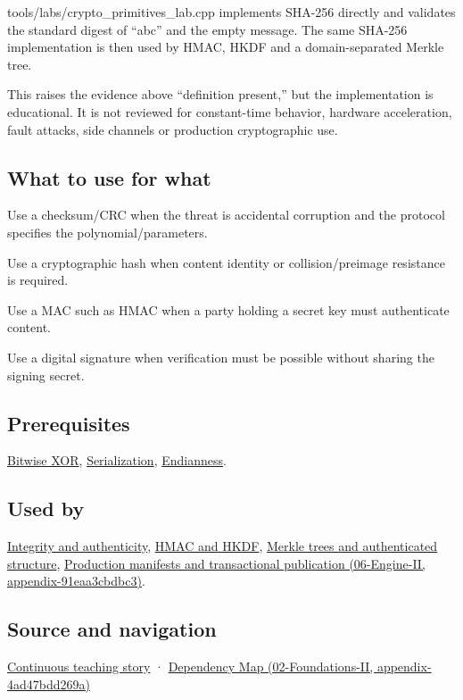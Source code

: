 tools/labs/crypto\_primitives\_lab.cpp implements SHA-256 directly and validates the standard digest of ``abc'' and the empty message. The same SHA-256 implementation is then used by HMAC, HKDF and a domain-separated Merkle tree.

This raises the evidence above ``definition present,'' but the implementation is educational. It is not reviewed for constant-time behavior, hardware acceleration, fault attacks, side channels or production cryptographic use.

\subsection{What to use for what}\label{appendix-ed338677de0a-what-to-use-for-what}

Use a checksum/CRC when the threat is accidental corruption and the protocol specifies the polynomial/parameters.

Use a cryptographic hash when content identity or collision/preimage resistance is required.

Use a MAC such as HMAC when a party holding a secret key must authenticate content.

Use a digital signature when verification must be possible without sharing the signing secret.

\subsection{Prerequisites}\label{appendix-ed338677de0a-prerequisites}

\hyperref[appendix-d49161831368]{Bitwise XOR}, \hyperref[appendix-91d09ebed979]{Serialization}, \hyperref[appendix-bc07c3d25b18]{Endianness}.

\subsection{Used by}\label{appendix-ed338677de0a-used-by}

\hyperref[appendix-cbe594d1ab0a]{Integrity and authenticity}, \hyperref[appendix-50af792c9da7]{HMAC and HKDF}, \hyperref[appendix-098192f8d46d]{Merkle trees and authenticated structure}, \href{../06-Engine-II/main.pdf\#nameddest=appendix-91eaa3cbdbc3}{Production manifests and transactional publication (06-Engine-II, appendix-91eaa3cbdbc3)}.

\subsection{Source and navigation}\label{appendix-ed338677de0a-source-and-navigation}

\hyperref[01-foundations-i-ch002-bytes-become-a-durable-agreement]{Continuous teaching story} · \href{../02-Foundations-II/main.pdf\#nameddest=appendix-4ad47bdd269a}{Dependency Map (02-Foundations-II, appendix-4ad47bdd269a)}
